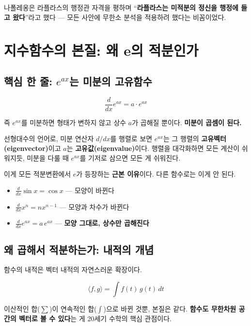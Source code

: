 \documentclass[11pt,a4paper]{article}
\begin{document}
나폴레옹은 라플라스의 행정관 자격을 평하며 ``\textbf{라플라스는 미적분의 정신을 행정에 들고 왔다}''라고 했다 --- 모든 사안에 무한소 분석을 적용하려 했다는 비꼼이었다.

\section{지수함수의 본질: 왜 e의 적분인가}

\subsection{핵심 한 줄: $e^{ax}$는 미분의 고유함수}

\begin{equation}
\frac{d}{dx}e^{ax} = a \cdot e^{ax}
\end{equation}

즉 $e^{ax}$를 미분하면 형태가 변하지 않고 상수 $a$가 곱해질 뿐이다. \textbf{미분이 곱셈이 된다.}

선형대수의 언어로, 미분 연산자 $d/dx$를 행렬로 보면 $e^{ax}$는 그 행렬의 \textbf{고유벡터(eigenvector)}이고 $a$는 \textbf{고유값(eigenvalue)}이다. 행렬을 대각화하면 모든 계산이 쉬워지듯, 미분을 다룰 때 $e^{ax}$를 기저로 삼으면 모든 게 쉬워진다.

이게 모든 적분변환에서 $e$가 등장하는 \textbf{근본 이유}이다. 다른 함수로는 이게 안 된다.

\begin{itemize}
\item $\frac{d}{dx}\sin x = \cos x$ --- 모양이 바뀐다
\item $\frac{d}{dx}x^n = nx^{n-1}$ --- 모양과 차수가 바뀐다
\item $\frac{d}{dx}e^{ax} = a\,e^{ax}$ --- \textbf{모양 그대로, 상수만 곱해진다}
\end{itemize}

\subsection{왜 곱해서 적분하는가: 내적의 개념}

함수의 내적은 벡터 내적의 자연스러운 확장이다.

\begin{equation}
\langle f, g \rangle = \int f(t)\, g(t)\, dt
\end{equation}

이산적인 합($\sum$)이 연속적인 합($\int$)으로 바뀐 것뿐, 본질은 같다. \textbf{함수도 무한차원 공간의 벡터로 볼 수 있다}는 게 20세기 수학의 핵심 관점이다.
\end{document}
